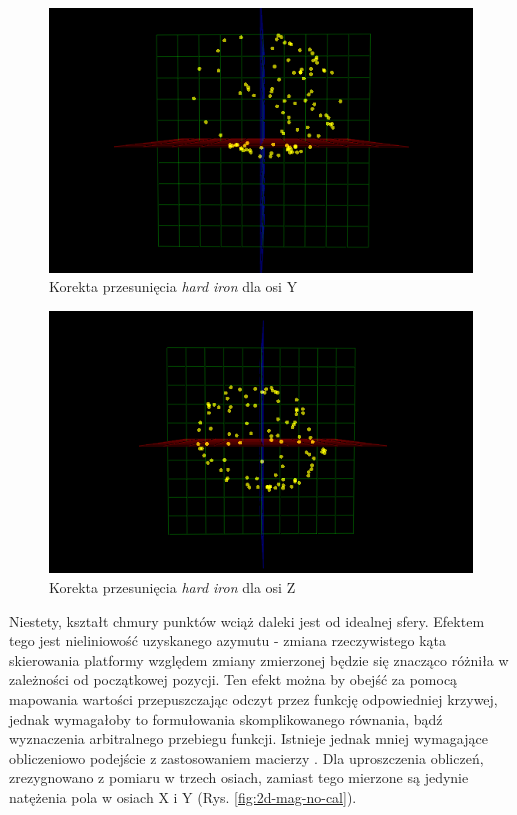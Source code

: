 \begin{figure}[H]
	\centering
		\includegraphics[width=0.6\linewidth]{rys/ScanBot-05-magnetometer-3d-calibration.PNG}
	\caption{Korekta przesunięcia \emph{hard iron} dla osi Y}
	\label{fig:3d-mag-hard-corr-y}
\end{figure}

\begin{figure}[H]
	\centering
		\includegraphics[width=0.6\linewidth]{rys/ScanBot-06-magnetometer-3d-calibration.PNG}
	\caption{Korekta przesunięcia \emph{hard iron} dla osi Z}
	\label{fig:3d-mag-hard-corr-z}
\end{figure}

Niestety, kształt chmury punktów wciąż daleki jest od idealnej sfery. Efektem tego jest nieliniowość uzyskanego azymutu - zmiana rzeczywistego kąta skierowania platformy względem zmiany zmierzonej będzie się znacząco różniła w zależności od początkowej pozycji. Ten efekt można by obejść za pomocą mapowania wartości przepuszczając odczyt przez funkcję odpowiedniej krzywej, jednak wymagałoby to formułowania skomplikowanego równania, bądź wyznaczenia arbitralnego przebiegu funkcji. Istnieje jednak mniej wymagające obliczeniowo podejście z zastosowaniem macierzy \cite{hard-soft-iron}. Dla uproszczenia obliczeń, zrezygnowano z pomiaru w trzech osiach, zamiast tego mierzone są jedynie natężenia pola w osiach X i Y (Rys. \ref{fig:2d-mag-no-cal}).

